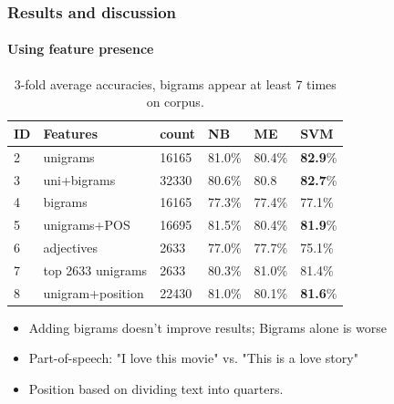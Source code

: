 \documentclass{beamer}
\begin{document}
\begin{frame}
	\frametitle{Results and discussion}
	\framesubtitle{Using feature presence}
	\begin{center}
		\begin{table}
			\begin{tabular}{l | l | l || l | l | l}
				ID & Features & count & NB & ME & SVM \\ \hline \hline
				2 & unigrams & 16165 & 81.0\% & 80.4\% & \textbf{82.9}\% \\
				3 & uni+bigrams & 32330 & 80.6\% & 80.8 & \textbf{82.7}\% \\
				4 & bigrams & 16165 & 77.3\% & 77.4\% & 77.1\% \pause \\ \hline \hline
				5 & unigrams+POS & 16695 & 81.5\% & 80.4\% & \textbf{81.9}\% \pause \\
				6 & adjectives & 2633 & 77.0\% & 77.7\% & 75.1\% \pause \\
				7 & top 2633 unigrams & 2633 & 80.3\% & 81.0\% & 81.4\% \pause \\
				8 & unigram+position & 22430 & 81.0\% & 80.1\% & \textbf{81.6}\% \\
			\end{tabular}
			\caption{3-fold average accuracies, bigrams appear at least 7 times on corpus.}
		\end{table}
	\end{center}
	\pause
	\begin{itemize}
		\item Adding bigrams doesn't improve results; Bigrams alone is worse \pause
		\item Part-of-speech: "I love this movie" vs. "This is a love story" \pause
		\item Position based on dividing text into quarters.
	\end{itemize}
\end{frame}
\end{document}
